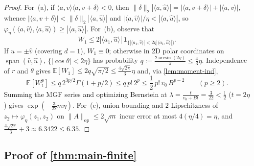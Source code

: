 \documentclass[11pt]{article}
\theoremstyle{plain}
\theoremstyle{remark}
\numberwithin{equation}{section}
\newcommand{\E}{\mathbb{E}}
\newcommand{\ind}{\mathbf{1}}
\newcommand{\ip}[2]{\langle #1, #2 \rangle}
\newcommand{\norm}[1]{\|#1\|}
\newcommand{\opnorm}[1]{\|#1\|_{\mathrm{op}}}
\begin{document}
\begin{proof}
For~(a), if $\ip{a}{v}\ip{a}{v+\delta} < 0$, then $\norm{\delta}_2|\ip{a}{\hat u}| = |\ip{a}{v+\delta}| + |\ip{a}{v}|$, whence $|\ip{a}{v+\delta}| < \norm{\delta}_2|\ip{a}{\hat u}|$ and $|\ip{a}{\hat v}|/\eta < |\ip{a}{\hat u}|$, so $\varphi_\eta(\ip{a}{\hat v}, \ip{a}{\hat u}) \ge |\ip{a}{\hat u}|$. For~(b), observe that
\[
  W_1 \le 2|\ip{a_1}{\hat u}|\,\ind_{\{|\ip{a_1}{\hat v}| < 2\eta|\ip{a_1}{\hat u}|\}}.
\]
If $\hat u = \pm \hat v$ (covering $d = 1$), $W_1 \equiv 0$; otherwise in 2D polar coordinates on $\operatorname{span}(\hat v, \hat u)$, $\{|\cos\theta| < 2\eta\}$ has probability $q := \frac{2\arcsin(2\eta)}{\pi} \le \frac{4}{3}\eta$. Independence of $r$ and $\theta$ gives $\E[W_1] \le 2q\sqrt{\pi/2} \le \frac{4\sqrt{2\pi}}{3}\eta$ and, via \cref{lem:moment-ind},
\[
  \E[W_1^p] \le q\,2^{3p/2}\Gamma(1+p/2) \le q\,p!\,2^p \le \frac{1}{2}\,p!\,v_0\,B^{p-2} \qquad (p \ge 2).
\]
Summing the MGF series and optimizing Bernstein at $\lambda = \frac{t}{v_0 + Bt} = \frac{3}{22} < \frac{1}{2}$ ($t = 2\eta$) gives $\exp(-\frac{3}{22}m\eta)$. For~(c), union bounding and $2$-Lipschitzness of $z_2 \mapsto \varphi_\eta(z_1, z_2)$ on $\opnorm{A} \le 2\sqrt{m}$ incur error at most $4(\eta/4) = \eta$, and $\frac{4\sqrt{2\pi}}{3} + 3 \approx 6.3422 \le 6.35$.
\end{proof}

\subsection{Proof of \texorpdfstring{\cref{thm:main-finite}}{Theorem 5.1}}
\end{document}
